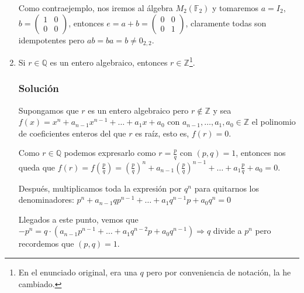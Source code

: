 \documentclass[paper=a4, fontsize=11pt, spanish]{scrartcl}
\begin{document}
\begin{enumerate}
		Como contraejemplo, nos iremos al álgebra $M_2(\mathbb{F}_2)$ y tomaremos $a = I_2$, $\displaystyle b =
		\begin{pmatrix} 1 & 0 \\ 0 & 0 \end{pmatrix}$, entonces $\displaystyle e = a+b = \begin{pmatrix} 0 & 0
		\\ 0 & 1 \end{pmatrix}$, claramente todas son idempotentes pero $ab = ba = b \neq 0_{2,2}$.
	
		\item Si $r \in \mathbb{Q}$ es un entero algebraico, entonces $r \in \mathbb{Z}$\footnote{En el enunciado
		original, era una $q$ pero por conveniencia de notación, la he cambiado.}.
		\subsubsection*{Solución}
		Supongamos que $r$ es un entero algebraico pero $r \notin \mathbb{Z}$ y sea $f(x) = x^n + a_{n-1}x^{n-1}
		+ \dots + a_1x + a_0$ con $a_{n-1}, \dots, a_1, a_0 \in \mathbb{Z}$ el polinomio de coeficientes enteros
		del que $r$ es raíz, esto es, $f(r) = 0$.
		
		Como $r \in \mathbb{Q}$ podemos expresarlo como $\displaystyle r = \frac{p}{q}$ con $(p, q) = 1$, entonces
		nos queda que $\displaystyle f(r) = f\left(\frac{p}{q}\right) = \left(\frac{p}{q}\right)^n + a_{n-1}
		\left(\frac{p}{q}\right)^{n-1} + \dots + a_1\frac{p}{q} + a_0 = 0$.
		
		Después, multiplicamos toda la expresión por $q^n$ para quitarnos los denominadores: $p^n + a_{n-1}qp^{n-1}
		+ \dots + a_1q^{n-1}p + a_0q^n = 0$
		
		Llegados a este punto, vemos que $-p^n = q \cdot \left(a_{n-1}p^{n-1} + \dots + a_1q^{n-2}p + a_0q^{n-1}\right)
		\Rightarrow q$ divide a $p^n$ pero recordemos que $(p, q) = 1$.
	\end{enumerate}
\end{document}
